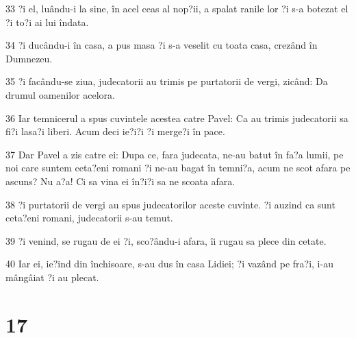 \par 33 ?i el, luându-i la sine, în acel ceas al nop?ii, a spalat ranile lor ?i s-a botezat el ?i to?i ai lui îndata.
\par 34 ?i ducându-i în casa, a pus masa ?i s-a veselit cu toata casa, crezând în Dumnezeu.
\par 35 ?i facându-se ziua, judecatorii au trimis pe purtatorii de vergi, zicând: Da drumul oamenilor acelora.
\par 36 Iar temnicerul a spus cuvintele acestea catre Pavel: Ca au trimis judecatorii sa fi?i lasa?i liberi. Acum deci ie?i?i ?i merge?i în pace.
\par 37 Dar Pavel a zis catre ei: Dupa ce, fara judecata, ne-au batut în fa?a lumii, pe noi care suntem ceta?eni romani ?i ne-au bagat în temni?a, acum ne scot afara pe ascuns? Nu a?a! Ci sa vina ei în?i?i sa ne scoata afara.
\par 38 ?i purtatorii de vergi au spus judecatorilor aceste cuvinte. ?i auzind ca sunt ceta?eni romani, judecatorii s-au temut.
\par 39 ?i venind, se rugau de ei ?i, sco?ându-i afara, îi rugau sa plece din cetate.
\par 40 Iar ei, ie?ind din închisoare, s-au dus în casa Lidiei; ?i vazând pe fra?i, i-au mângâiat ?i au plecat.

\chapter{17}


